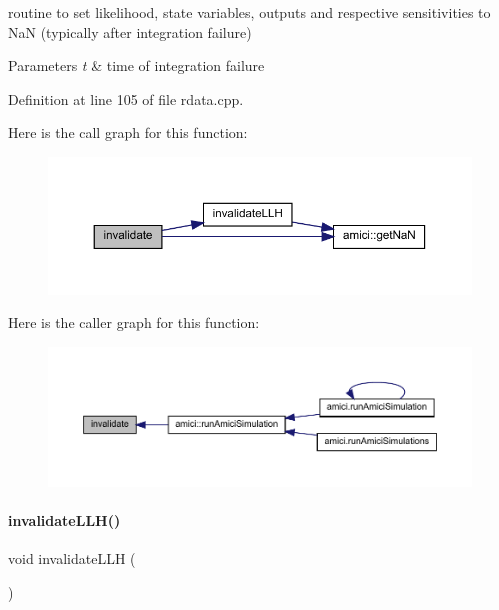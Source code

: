 routine to set likelihood, state variables, outputs and respective sensitivities to NaN (typically after integration failure) 
\begin{DoxyParams}{Parameters}
{\em t} & time of integration failure\\
\hline
\end{DoxyParams}


Definition at line 105 of file rdata.\+cpp.

Here is the call graph for this function\+:
\nopagebreak
\begin{figure}[H]
\begin{center}
\leavevmode
\includegraphics[width=350pt]{classamici_1_1_return_data_ab320e46748c17908f0bd4bba240b8e92_cgraph}
\end{center}
\end{figure}
Here is the caller graph for this function\+:
\nopagebreak
\begin{figure}[H]
\begin{center}
\leavevmode
\includegraphics[width=350pt]{classamici_1_1_return_data_ab320e46748c17908f0bd4bba240b8e92_icgraph}
\end{center}
\end{figure}
\mbox{\label{classamici_1_1_return_data_a03e88745280c032d3b59fd7235665e17}} 
\paragraph{\texorpdfstring{invalidate\+L\+L\+H()}{invalidateLLH()}}
{\footnotesize\ttfamily void invalidate\+L\+LH (\begin{DoxyParamCaption}{ }\end{DoxyParamCaption})}

